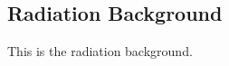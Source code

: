 \subsection{Radiation Background}
\label{sec:Radiation-Background}

This is the radiation background.


